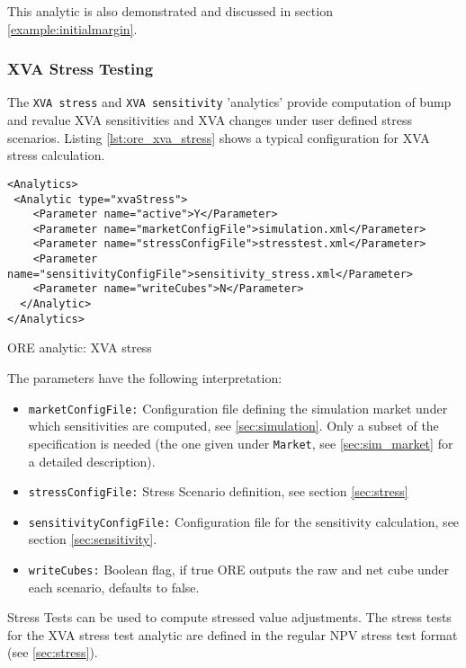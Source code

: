 {This analytic is also demonstrated and discussed in section \ref{example:initialmargin}.

\subsubsection{XVA Stress Testing}

The {\tt XVA stress} and {\tt XVA sensitivity} 'analytics' provide computation of bump and revalue 
XVA sensitivities and XVA changes under user defined stress scenarios. Listing \ref{lst:ore_xva_stress}
shows a typical configuration for XVA stress calculation.

\begin{listing}[H]
\begin{verbatim}
<Analytics>
 <Analytic type="xvaStress">
    <Parameter name="active">Y</Parameter>
    <Parameter name="marketConfigFile">simulation.xml</Parameter>
    <Parameter name="stressConfigFile">stresstest.xml</Parameter>
    <Parameter name="sensitivityConfigFile">sensitivity_stress.xml</Parameter>
    <Parameter name="writeCubes">N</Parameter>
  </Analytic>
</Analytics>
\end{verbatim}
\caption{ORE analytic: XVA stress}
\label{lst:ore_xva_stress}
\end{listing}

The parameters have the following interpretation:

\begin{itemize}
\item {\tt marketConfigFile:} Configuration file defining the simulation market under which sensitivities are computed,
  see \ref{sec:simulation}. Only a subset of the specification is needed (the one given under {\tt Market}, see
  \ref{sec:sim_market} for a detailed description).
  \item {\tt stressConfigFile:} Stress Scenario definition, see section \ref{sec:stress}
  \item {\tt sensitivityConfigFile:} Configuration file  for the sensitivity calculation, see section \ref{sec:sensitivity}.
  \item {\tt writeCubes:} Boolean flag, if true ORE outputs the raw and net cube under each scenario, defaults to false.
\end{itemize}

Stress Tests can be used to compute stressed value adjustments. The stress tests for the XVA stress test analytic are
defined in the regular NPV stress test format (see \ref{sec:stress}).

}
